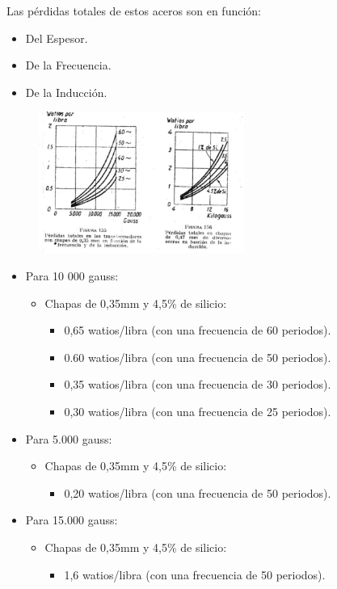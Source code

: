 \documentclass[12pt,a4paper]{article}
\begin{document}
Las pérdidas totales de estos aceros son en función:
\begin{itemize}
    \item Del Espesor.
    \item De la Frecuencia.
    \item De la Inducción.
\end{itemize}

\begin{figure}[H]    
    \centering         
    \includegraphics[width=0.6\textwidth]{IMAGENES LATEX/5.jpg}
\end{figure}

\begin{itemize}
    \item Para 10 000 gauss: 
    \begin{itemize}
        \item Chapas de 0,35mm y 4,5\% de silicio: 
        \begin{itemize}
        \item 0,65 watios/libra (con una frecuencia de 60 periodos).
        \item 0.60 watios/libra (con una frecuencia de 50 periodos).
        \item 0,35 watios/libra (con una frecuencia de 30 periodos).
        \item 0,30 watios/libra (con una frecuencia de 25 periodos).
        \end{itemize}
    \end{itemize}
\item Para 5.000 gauss: 
    \begin{itemize}
        \item Chapas de 0,35mm y 4,5\% de silicio:
        \begin{itemize}
            \item 0,20 watios/libra (con una frecuencia de 50 periodos).
        \end{itemize}
    \end{itemize}
\item Para 15.000 gauss:
    \begin{itemize}
        \item Chapas de 0,35mm y 4,5\% de silicio:
        \begin{itemize}
            \item 1,6 watios/libra (con una frecuencia de 50 periodos).
        \end{itemize}
    \end{itemize}
\end{itemize}
\end{document}
